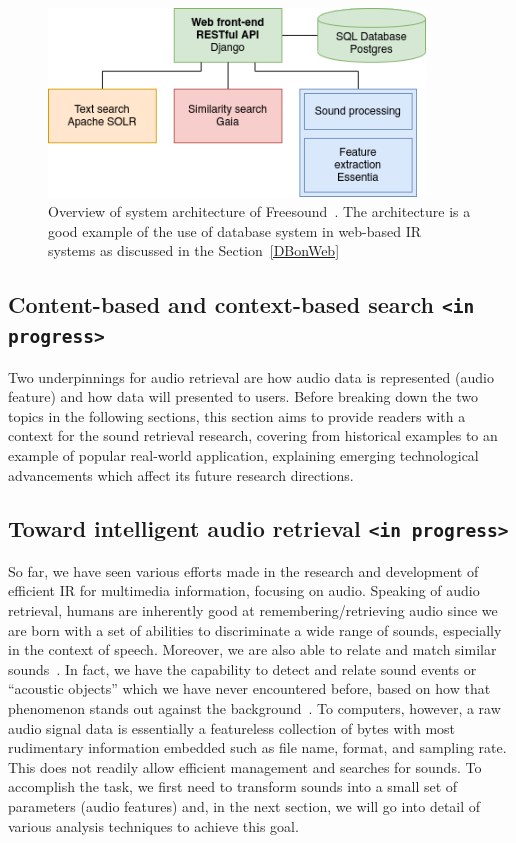 
\begin{figure}[htb]
	\centering
	\includegraphics[width=10cm]{Figures/freesound_api.png}
	\caption{Overview of system architecture of Freesound~\cite{frederic2013}. The architecture is a good example of the use of database system in web-based IR systems as discussed in the Section~\ref{DBonWeb}}
	\label{freesound-api}
\end{figure}


\subsection{Content-based and context-based search \texttt{<in progress>}}

Two underpinnings for audio retrieval are how audio data is represented (audio feature) and how data will presented to users. Before breaking down the two topics in the following sections, this section aims to provide readers with a context for the sound retrieval research, covering from historical examples to an example of popular real-world application, explaining emerging technological advancements which affect its future research directions.

\subsection{Toward intelligent audio retrieval \texttt{<in progress>}}
So far, we have seen various efforts made in the research and development of efficient IR for multimedia information, focusing on audio. Speaking of audio retrieval, humans are inherently good at remembering/retrieving audio since we are born with a set of abilities to discriminate a wide range of sounds, especially in the context of speech. Moreover, we are also able to relate and match similar sounds~\cite{denise1995}. In fact, we have the capability to detect and relate sound events or “acoustic objects” which we have never encountered before, based on how that phenomenon stands out against the background~\cite{kumar2014}. To computers, however, a raw audio signal data is essentially a featureless collection of bytes with most rudimentary information embedded such as file name, format, and sampling rate. This does not readily allow efficient management and searches for sounds. To accomplish the task, we first need to transform sounds into a small set of parameters (audio features) and, in the next section, we will go into detail of various analysis techniques to achieve this goal. 


